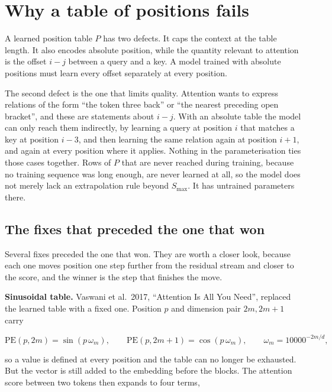 \hypertarget{why-a-table-of-positions-fails}{%
\section{Why a table of positions
fails}\label{why-a-table-of-positions-fails}}

A learned position table \(P\) has two defects. It caps the context at
the table length. It also encodes absolute position, while the quantity
relevant to attention is the offset \(i - j\) between a query and a key.
A model trained with absolute positions must learn every offset
separately at every position.

The second defect is the one that limits quality. Attention wants to
express relations of the form ``the token three back'' or ``the nearest
preceding open bracket'', and these are statements about \(i - j\). With
an absolute table the model can only reach them indirectly, by learning
a query at position \(i\) that matches a key at position \(i - 3\), and
then learning the same relation again at position \(i + 1\), and again
at every position where it applies. Nothing in the parameterisation ties
those cases together. Rows of \(P\) that are never reached during
training, because no training sequence was long enough, are never
learned at all, so the model does not merely lack an extrapolation rule
beyond \(S_{\max}\). It has untrained parameters there.

\hypertarget{the-fixes-that-preceded-the-one-that-won}{%
\subsection{The fixes that preceded the one that
won}\label{the-fixes-that-preceded-the-one-that-won}}

Several fixes preceded the one that won. They are worth a closer look,
because each one moves position one step further from the residual
stream and closer to the score, and the winner is the step that finishes
the move.

\textbf{Sinusoidal table.} Vaswani et al.~2017, ``Attention Is All You
Need'', replaced the learned table with a fixed one. Position \(p\) and
dimension pair \(2m, 2m+1\) carry

\[
\text{PE}(p, 2m) = \sin(p\,\omega_m), \qquad \text{PE}(p, 2m+1) = \cos(p\,\omega_m), \qquad
\omega_m = 10000^{-2m/d},
\]

so a value is defined at every position and the table can no longer be
exhausted. But the vector is still added to the embedding before the
blocks. The attention score between two tokens then expands to four
terms,

